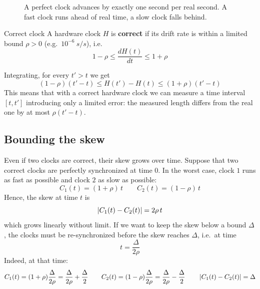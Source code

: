 \begin{figure}[H]
  \centering
  \caption{A perfect clock advances by exactly one second per real second. A fast clock runs ahead of real time, a slow clock falls behind.}
  \label{fig:drift}
\end{figure}

\begin{frameddefn}{Correct clock}
  A hardware clock $H$ is \textbf{correct} if its drift rate is within a limited bound $\rho > 0$ (e.g.\ $10^{-6}\ s/s$), i.e.
  \[1 - \rho \leq \frac{dH(t)}{dt} \leq 1 + \rho\]
\end{frameddefn}

Integrating, for every $t' > t$ we get
\[(1 - \rho)(t' - t) \leq H(t') - H(t) \leq (1 + \rho)(t' - t)\]
This means that with a correct hardware clock we can measure a time interval $[t, t']$ introducing only a limited error: the measured length differs from the real one by at most $\rho (t' - t)$.

\subsection{Bounding the skew}

Even if two clocks are correct, their skew grows over time. Suppose that two correct clocks are perfectly synchronized at time $0$. In the worst case, clock $1$ runs as fast as possible and clock $2$ as slow as possible:
\[C_1(t) = (1 + \rho)\, t \qquad C_2(t) = (1 - \rho)\, t\]
Hence, the skew at time $t$ is
\[\left\lvert C_1(t) - C_2(t)\right\rvert = 2\rho\, t\]
which grows linearly without limit. If we want to keep the skew below a bound $\Delta$, the clocks must be re-synchronized before the skew reaches $\Delta$, i.e.\ at time
\[t = \frac{\Delta}{2\rho}\]
Indeed, at that time:
\[C_1(t) = (1+\rho)\frac{\Delta}{2\rho} = \frac{\Delta}{2\rho} + \frac{\Delta}{2} \qquad C_2(t) = (1-\rho)\frac{\Delta}{2\rho} = \frac{\Delta}{2\rho} - \frac{\Delta}{2} \qquad \left\lvert C_1(t) - C_2(t)\right\rvert = \Delta\]

